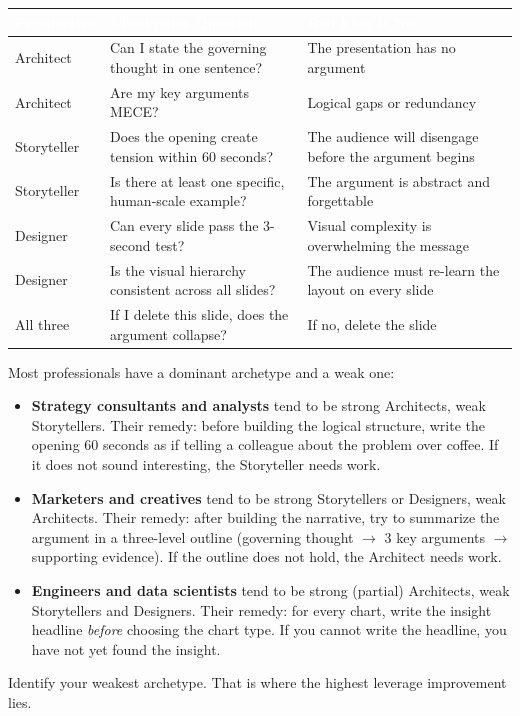 \begin{center}
\begin{tabularx}{\textwidth}{>{\raggedright}p{2.5cm} >{\raggedright}p{5cm} >{\raggedright\arraybackslash}p{6cm}}
\toprule
\rowcolor{tableheader} \textcolor{white}{\textbf{Perspective}} & \textcolor{white}{\textbf{Checkpoint Question}} & \textcolor{white}{\textbf{Red Flag If No}} \\
\midrule
Architect & Can I state the governing thought in one sentence? & The presentation has no argument \\
\rowcolor{altrow}
Architect & Are my key arguments MECE? & Logical gaps or redundancy \\
Storyteller & Does the opening create tension within 60 seconds? & The audience will disengage before the argument begins \\
\rowcolor{altrow}
Storyteller & Is there at least one specific, human-scale example? & The argument is abstract and forgettable \\
Designer & Can every slide pass the 3-second test? & Visual complexity is overwhelming the message \\
\rowcolor{altrow}
Designer & Is the visual hierarchy consistent across all slides? & The audience must re-learn the layout on every slide \\
All three & If I delete this slide, does the argument collapse? & If no, delete the slide \\
\bottomrule
\end{tabularx}
\end{center}

\begin{lessonbox}
Most professionals have a dominant archetype and a weak one:

\begin{itemize}
  \item \textbf{Strategy consultants and analysts} tend to be strong Architects, weak Storytellers. Their remedy: before building the logical structure, write the opening 60 seconds as if telling a colleague about the problem over coffee. If it does not sound interesting, the Storyteller needs work.
  \item \textbf{Marketers and creatives} tend to be strong Storytellers or Designers, weak Architects. Their remedy: after building the narrative, try to summarize the argument in a three-level outline (governing thought $\rightarrow$ 3 key arguments $\rightarrow$ supporting evidence). If the outline does not hold, the Architect needs work.
  \item \textbf{Engineers and data scientists} tend to be strong (partial) Architects, weak Storytellers and Designers. Their remedy: for every chart, write the insight headline \emph{before} choosing the chart type. If you cannot write the headline, you have not yet found the insight.
\end{itemize}

Identify your weakest archetype. That is where the highest leverage improvement lies.
\end{lessonbox}

\clearpage
